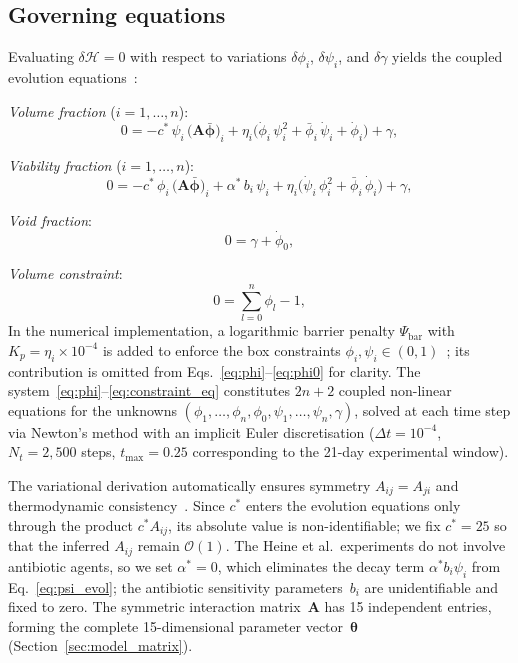 \documentclass[11pt,a4paper]{article}
\newcommand{\btheta}{\boldsymbol{\theta}}
\newcommand{\bphi}{\boldsymbol{\phi}}
\begin{document}
\subsection{Governing equations}

Evaluating $\delta\mathcal{H}=0$ with respect to variations $\delta\phi_i$, $\delta\psi_i$, and $\delta\gamma$ yields the coupled evolution equations~\cite{Klempt2025ContinuumBiofilm}:

\medskip\noindent
\textit{Volume fraction} ($i=1,\dots,n$):
\begin{equation}
0 = -c^*\,\psi_i\,\bigl(\mathbf{A}\bar{\bphi}\bigr)_i
    + \eta_i\bigl(\dot\phi_i\,\psi_i^2 + \bar\phi_i\,\dot\psi_i + \dot\phi_i\bigr)
    + \gamma,
\label{eq:phi}
\end{equation}

\noindent\textit{Viability fraction} ($i=1,\dots,n$):
\begin{equation}
0 = -c^*\,\phi_i\,\bigl(\mathbf{A}\bar{\bphi}\bigr)_i
    + \alpha^*\,b_i\,\psi_i
    + \eta_i\bigl(\dot\psi_i\,\phi_i^2 + \bar\phi_i\,\dot\phi_i\bigr)
    + \gamma,
\label{eq:psi_evol}
\end{equation}

\noindent\textit{Void fraction}:
\begin{equation}
0 = \gamma + \dot\phi_0,
\label{eq:phi0}
\end{equation}

\noindent\textit{Volume constraint}:
\begin{equation}
0 = \sum_{l=0}^{n}\phi_l - 1,
\label{eq:constraint_eq}
\end{equation}
In the numerical implementation, a logarithmic barrier penalty $\Psi_{\mathrm{bar}}$ with $K_p=\eta_i\times10^{-4}$ is added to enforce the box constraints $\phi_i,\psi_i\in(0,1)$~\cite{Klempt2025ContinuumBiofilm}; its contribution is omitted from Eqs.~\eqref{eq:phi}--\eqref{eq:phi0} for clarity.
The system~\eqref{eq:phi}--\eqref{eq:constraint_eq} constitutes $2n+2$ coupled non-linear equations for the unknowns $(\phi_1,\dots,\phi_n,\phi_0,\psi_1,\dots,\psi_n,\gamma)$, solved at each time step via Newton's method with an implicit Euler discretisation ($\Delta t = 10^{-4}$, $N_t=2{,}500$ steps, $t_{\max}=0.25$ corresponding to the 21-day experimental window).

The variational derivation automatically ensures symmetry $A_{ij}=A_{ji}$ and thermodynamic consistency~\cite{JunkerBalzani2021ExtendedHamilton}.
Since $c^*$ enters the evolution equations only through the product $c^*A_{ij}$, its absolute value is non-identifiable; we fix $c^*=25$ so that the inferred $A_{ij}$ remain $\mathcal{O}(1)$.
The Heine et al.\ experiments do not involve antibiotic agents, so we set $\alpha^*=0$, which eliminates the decay term $\alpha^*b_i\psi_i$ from Eq.~\eqref{eq:psi_evol}; the antibiotic sensitivity parameters~$b_i$ are unidentifiable and fixed to zero.
The symmetric interaction matrix~$\mathbf{A}$ has 15 independent entries, forming the complete 15-dimensional parameter vector~$\btheta$ (Section~\ref{sec:model_matrix}).
\end{document}
